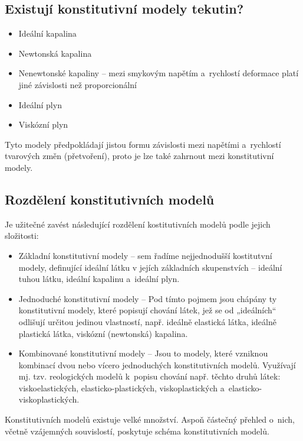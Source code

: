 \subsection{Existují konstitutivní modely tekutin?}
\begin{itemize}
	\item Ideální kapalina
	\item Newtonská kapalina
	\item Nenewtonské kapaliny -- mezi smykovým napětím a~rychlostí deformace platí jiné závislosti než proporcionální
	\item Ideální plyn
	\item Viskózní plyn
\end{itemize}

Tyto modely předpokládají jistou formu závislosti mezi napětími a~rychlostí tvarových změn (přetvoření), proto je lze také zahrnout mezi konstitutivní modely.

\subsection{Rozdělení konstitutivních modelů}
Je užitečné zavést následující rozdělení kostitutivních modelů podle jejich složitosti: 
\begin{itemize}
	\item Základní konstitutivní modely -- sem řadíme nejjednodušší kostitutvní modely, definující ideální látku v jejích základních skupenstvích -- ideální tuhou látku, ideální kapalinu a~ideální plyn.
	\item Jednoduché konstitutivní modely -- Pod tímto pojmem jsou chápány ty konstitutivní modely, které popisují chování látek, jež se od  „ideálních“ odlišují určitou jedinou vlastností, např. ideálně elastická látka, ideálně plastická látka, viskózní (newtonská) kapalina.
	\item Kombinované konstitutivní modely – Jsou to modely, které vzniknou kombinací dvou nebo vícero jednoduchých konstitutivních modelů. Využívají mj. tzv. reologických modelů k~popisu chování např. těchto druhů látek: viskoelastických, elasticko-plastických, viskoplastických a~elasticko-viskoplastických.
\end{itemize}

Konstitutivních modelů existuje velké množství.
Aspoň částečný přehled o~nich, včetně vzájemných souvislostí, poskytuje schéma konstitutivních modelů.

